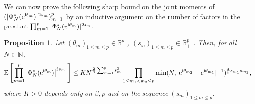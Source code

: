 \documentclass[]{article}
\newtheorem{prop}[thm]{Proposition}
\begin{document}
We can now prove the following sharp bound on the joint moments of $(|\Phi^*_{N} (\mathrm{e}^{\textnormal{i} \theta_m})|^{2s_m})_{m=1}^p$ by an inductive argument on the number of factors in the product $\prod_{m=1}^p |\Phi^*_{N} (\mathrm{e}^{\textnormal{i} \theta_m})|^{2s_m}$.

\begin{prop}\label{FinalBoundProp}
Let $(\theta_m)_{1 \leq m \leq p}\in \mathbb{R}^p$ 
, $(s_m)_{1 \leq m \leq p}\in \mathbb{R}_+^p$ . 
Then, for all $N \in \mathbb{N}$, 
$$\mathbb{E} \left[ \prod_{m=1}^p \left|\Phi^*_{N} (\mathrm{e}^{\textnormal{i} \theta_m})\right|^{2s_m} \;  \right]
\leq K N^{\frac{2}{\beta} \sum_{m=1}^p s_m^2}  \prod_{1 \leq m_1 < m_2 \leq p} 
\min(N, |\mathrm{e}^{\textnormal{i} \theta_{m_2}} - \mathrm{e}^{\textnormal{i} \theta_{m_1}} |^{-1})^{\frac{4}{\beta} s_{m_1} s_{m_2}},
$$
where $K > 0$ depends only on $\beta, p$
and on the sequence $(s_m)_{1 \leq m \leq p}$. 
\end{prop}
\end{document}
